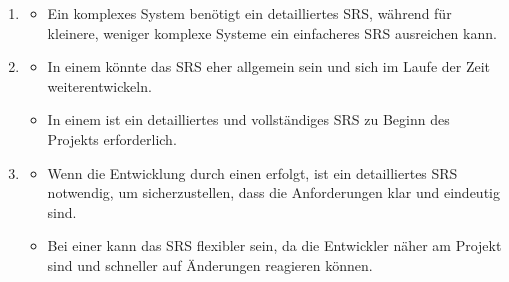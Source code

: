 \begin{infoBox}[title=Der Detaillierungsgrad des SRS hängt ab von ...]
    \begin{enumerate}
        \item {}
        \begin{itemize}
            \item Ein komplexes System benötigt ein detailliertes SRS, während für kleinere, weniger komplexe Systeme ein einfacheres SRS ausreichen kann.
        \end{itemize}
        \item {}
        \begin{itemize}
            \item In einem  könnte das SRS eher allgemein sein und sich im Laufe der Zeit weiterentwickeln.
            \item In einem  ist ein detailliertes und vollständiges SRS zu Beginn des Projekts erforderlich.
        \end{itemize}
        \item {}
        \begin{itemize}
            \item Wenn die Entwicklung durch einen  erfolgt, ist ein detailliertes SRS notwendig, um sicherzustellen, dass die Anforderungen klar und eindeutig sind.
            \item Bei einer  kann das SRS flexibler sein, da die Entwickler näher am Projekt sind und schneller auf Änderungen reagieren können.
        \end{itemize}
    \end{enumerate}
\end{infoBox}

